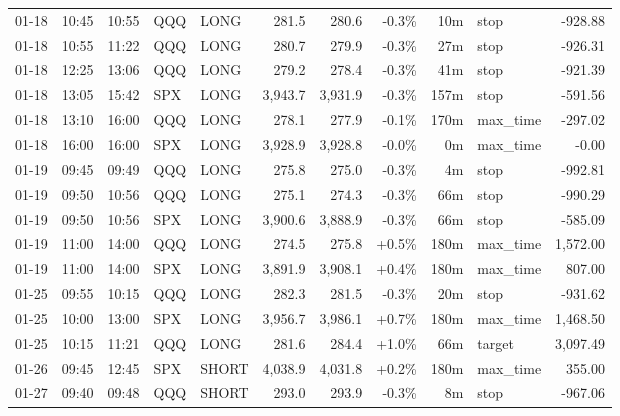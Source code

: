 \documentclass[11pt,a4paper,twoside]{article}
\begin{document}
\begin{center}
\begin{longtable}{>{\color{txtmain}}l l l l l r r r r >{\color{txtmain}}l r}
01-18 & 10:45 & 10:55 & QQQ & LONG & 281.5 & 280.6 & \textcolor{lossred}{-0.3\%} & 10m & stop & \textcolor{lossred}{-928.88} \\
01-18 & 10:55 & 11:22 & QQQ & LONG & 280.7 & 279.9 & \textcolor{lossred}{-0.3\%} & 27m & stop & \textcolor{lossred}{-926.31} \\
01-18 & 12:25 & 13:06 & QQQ & LONG & 279.2 & 278.4 & \textcolor{lossred}{-0.3\%} & 41m & stop & \textcolor{lossred}{-921.39} \\
01-18 & 13:05 & 15:42 & SPX & LONG & 3,943.7 & 3,931.9 & \textcolor{lossred}{-0.3\%} & 157m & stop & \textcolor{lossred}{-591.56} \\
01-18 & 13:10 & 16:00 & QQQ & LONG & 278.1 & 277.9 & \textcolor{lossred}{-0.1\%} & 170m & max\_time & \textcolor{lossred}{-297.02} \\
01-18 & 16:00 & 16:00 & SPX & LONG & 3,928.9 & 3,928.8 & \textcolor{lossred}{-0.0\%} & 0m & max\_time & \textcolor{lossred}{-0.00} \\
01-19 & 09:45 & 09:49 & QQQ & LONG & 275.8 & 275.0 & \textcolor{lossred}{-0.3\%} & 4m & stop & \textcolor{lossred}{-992.81} \\
01-19 & 09:50 & 10:56 & QQQ & LONG & 275.1 & 274.3 & \textcolor{lossred}{-0.3\%} & 66m & stop & \textcolor{lossred}{-990.29} \\
01-19 & 09:50 & 10:56 & SPX & LONG & 3,900.6 & 3,888.9 & \textcolor{lossred}{-0.3\%} & 66m & stop & \textcolor{lossred}{-585.09} \\
01-19 & 11:00 & 14:00 & QQQ & LONG & 274.5 & 275.8 & \textcolor{wingreen}{+0.5\%} & 180m & max\_time & \textcolor{wingreen}{1,572.00} \\
01-19 & 11:00 & 14:00 & SPX & LONG & 3,891.9 & 3,908.1 & \textcolor{wingreen}{+0.4\%} & 180m & max\_time & \textcolor{wingreen}{807.00} \\
01-25 & 09:55 & 10:15 & QQQ & LONG & 282.3 & 281.5 & \textcolor{lossred}{-0.3\%} & 20m & stop & \textcolor{lossred}{-931.62} \\
01-25 & 10:00 & 13:00 & SPX & LONG & 3,956.7 & 3,986.1 & \textcolor{wingreen}{+0.7\%} & 180m & max\_time & \textcolor{wingreen}{1,468.50} \\
01-25 & 10:15 & 11:21 & QQQ & LONG & 281.6 & 284.4 & \textcolor{wingreen}{+1.0\%} & 66m & target & \textcolor{wingreen}{3,097.49} \\
01-26 & 09:45 & 12:45 & SPX & SHORT & 4,038.9 & 4,031.8 & \textcolor{wingreen}{+0.2\%} & 180m & max\_time & \textcolor{wingreen}{355.00} \\
01-27 & 09:40 & 09:48 & QQQ & SHORT & 293.0 & 293.9 & \textcolor{lossred}{-0.3\%} & 8m & stop & \textcolor{lossred}{-967.06} \\

\end{longtable}
\end{center}
\end{document}
